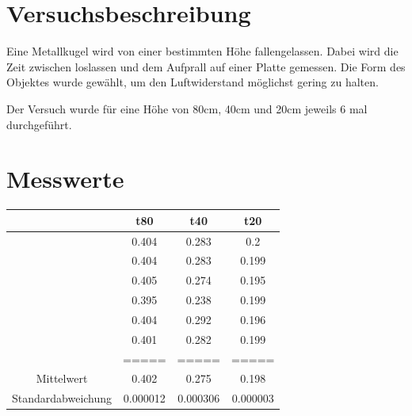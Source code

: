 \documentclass[8pt, letterpaper]{article}
\begin{document}

\section{Versuchsbeschreibung}
Eine Metallkugel wird von einer bestimmten Höhe fallengelassen. Dabei wird die Zeit zwischen loslassen und dem Aufprall auf einer Platte gemessen. Die Form des Objektes wurde gewählt, um den Luftwiderstand möglichst gering zu halten.

Der Versuch wurde für eine Höhe von 80cm, 40cm und 20cm jeweils 6 mal durchgeführt.

\section{Messwerte}
\begin{tabular} { c|c|c|c }
  & t80 & t40 & t20 \\
  \hline
  & 0.404 & 0.283 & 0.2 \\
  & 0.404 & 0.283 & 0.199 \\
  & 0.405 & 0.274 & 0.195 \\
  & 0.395 & 0.238 & 0.199 \\
  & 0.404 & 0.292 & 0.196 \\
  & 0.401 & 0.282 & 0.199 \\
  & ===== & ===== & ===== \\
  Mittelwert & 0.402 & 0.275 & 0.198 \\
  Standardabweichung & 0.000012 & 0.000306 & 0.000003
\end{tabular}

\hfill \break

\end{document}
